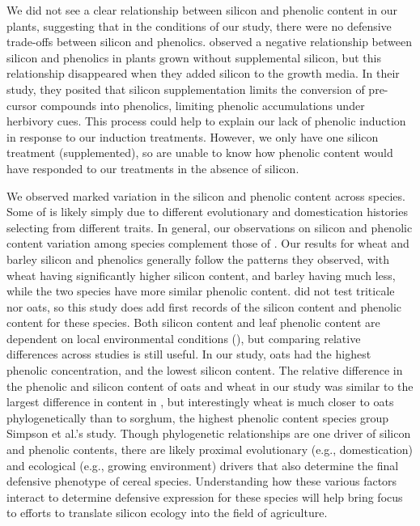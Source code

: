 \documentclass[12pt, letterpaper]{report}
\begin{document}
We did not see a clear relationship between silicon and phenolic content in our plants, suggesting that in the conditions of our study, there were no defensive trade-offs between silicon and phenolics. \textcite{waterman_short-term_2021} observed a negative relationship between silicon and phenolics in plants grown without supplemental silicon, but this relationship disappeared when they added silicon to the growth media. In their study, they posited that silicon supplementation limits the conversion of pre-cursor compounds into phenolics, limiting phenolic accumulations under herbivory cues. This process could help to explain our lack of phenolic induction in response to our induction treatments. However, we only have one silicon treatment (supplemented), so are unable to know how phenolic content would have responded to our treatments in the absence of silicon. 

We observed marked variation in the silicon and phenolic content across species. Some of is likely simply due to different evolutionary and domestication histories selecting from different traits. In general, our observations on silicon and phenolic content variation among species complement those of \textcite{simpson_still_2017} . Our results for wheat and barley silicon and phenolics generally follow the patterns they observed, with wheat having significantly higher silicon content, and barley having much less, while the two species have more similar phenolic content. \textcite{simpson_still_2017} did not test triticale nor oats, so this study does add first records of the silicon content and phenolic content for these species. Both silicon content and leaf phenolic content are dependent on local environmental conditions (\cite{schaller_silicon_2012,quigley_soil_2020}), but comparing relative differences across studies is still useful. In our study, oats had the highest phenolic concentration, and the lowest silicon content. The relative difference in the phenolic and silicon content of oats and wheat in our study was similar to the largest difference in content in \textcite{simpson_still_2017}, but interestingly wheat is much closer to oats phylogenetically than to sorghum, the highest phenolic content species group Simpson et al.’s study. Though phylogenetic relationships are one driver of silicon and phenolic contents, there are likely proximal evolutionary (e.g., domestication) and ecological (e.g., growing environment) drivers that also determine the final defensive phenotype of cereal species. Understanding how these various factors interact to determine defensive expression for these species will help bring focus to efforts to translate silicon ecology into the field of agriculture. 
\end{document}
